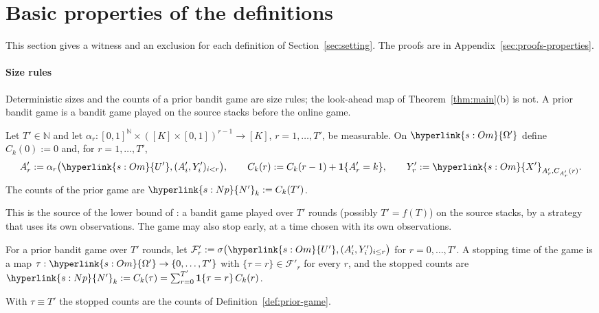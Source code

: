 \documentclass[11pt]{article}
\newcommand{\dt}[1]{\hypertarget{#1}{}}
\newcommand{\sy}[2]{\hyperlink{#1}{#2}}
\newcommand{\N}{\mathbb{N}}
\newcommand{\ind}{\mathbf{1}}
\newcommand{\Np}{\sy{s:Np}{N'}}
\newcommand{\Om}{\sy{s:Om}{\Omega'}}
\newcommand{\Up}{\sy{s:Om}{U'}}
\newcommand{\Xp}{\sy{s:Om}{X'}}
\begin{document}
\section{Basic properties of the definitions}\label{sec:properties}

This section gives a witness and an exclusion for each definition of Section~\ref{sec:setting}. The
proofs are in Appendix~\ref{sec:proofs-properties}.

\paragraph{Size rules} Deterministic sizes and the counts of a prior bandit game are size rules;
the look-ahead map of Theorem~\ref{thm:main}(b) is not. A prior bandit game is a bandit game
played on the source stacks before the online game.

\begin{definition}\label{def:prior-game}
Let $T'\in\N$ and let $\alpha_r:[0,1]^{\N}\times([K]\times[0,1])^{r-1}\to[K]$, $r=1,\dots,T'$, be
measurable.\dt{s:game0} On $\Om$ define $C_k(0):=0$ and, for $r=1,\dots,T'$,
\begin{equation*}
A'_r:=\alpha_r\big(\Up,(A'_i,Y'_i)_{i<r}\big),\qquad C_k(r):=C_k(r-1)+\ind\{A'_r=k\},\qquad
Y'_r:=\Xp_{A'_r,C_{A'_r}(r)}.
\end{equation*}
The counts of the prior game are $\Np_k:=C_k(T')$.
\end{definition}

This is the source of the lower bound of \citet[Theorem~2]{PMRM26}: a bandit game played over $T'$
rounds (possibly $T'=f(T)$) on the source stacks, by a strategy that uses its own observations. The
game may also stop early, at a time chosen with its own observations.

\begin{definition}\label{def:stopped-game}
For a prior bandit game over $T'$ rounds,\dt{s:stopped} let $\mathcal F'_r:=\sigma\big(\Up,(A'_i,Y'_i)_{i\le r}\big)$
for $r=0,\dots,T'$. A stopping time of the game is a map $\tau:\Om\to\{0,\dots,T'\}$ with
$\{\tau=r\}\in\mathcal F'_r$ for every $r$, and the stopped counts are
$\Np_k:=C_k(\tau)=\sum_{r=0}^{T'}\ind\{\tau=r\}\,C_k(r)$.
\end{definition}

With $\tau\equiv T'$ the stopped counts are the counts of Definition~\ref{def:prior-game}.
\end{document}
